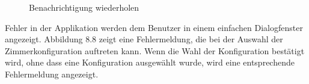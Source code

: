 \begin{figure}[h]
\begin{minipage}[b]{0.45\textwidth}
        \caption{Benachrichtigung wiederholen}
    \end{minipage}
    \label{fig:MobileClient-Screens4}
\end{figure}

Fehler in der Applikation werden dem Benutzer in einem einfachen Dialogfenster angezeigt.
Abbildung 8.8 zeigt eine Fehlermeldung, die bei der Auswahl der Zimmerkonfiguration auftreten kann.
Wenn die Wahl der Konfiguration bestätigt wird, ohne dass eine Konfiguration ausgewählt wurde, wird eine entsprechende Fehlermeldung angezeigt.

\clearpage


